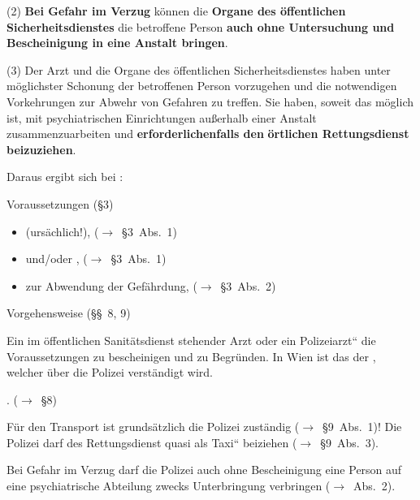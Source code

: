 {\mdseries
(2) \textbf{Bei Gefahr im Verzug} können die \textbf{Organe des
öffentlichen Sicherheitsdienstes} die betroffene Person \textbf{auch
ohne Untersuchung und Bescheinigung in eine Anstalt bringen}.}

{\mdseries
(3) Der Arzt und die Organe des öffentlichen Sicherheitsdienstes haben
unter möglichster Schonung der betroffenen Person vorzugehen und die
notwendigen Vorkehrungen zur Abwehr von Gefahren zu treffen. Sie haben,
soweit das möglich ist, mit psychiatrischen Einrichtungen
au{\ss}erhalb einer Anstalt zusammenzuarbeiten und
\textbf{erforderlichenfalls den }\textbf{örtlichen Rettungsdienst
beizuziehen}.}

{\mdseries
Daraus ergibt sich bei
:}

{\color{black}
Voraussetzungen ({\S}3)}

\begin{itemize}
\item {}
(ursächlich!), (${\rightarrow}$~{\S}3~Abs.~1)

\item {}  und/oder
,
(${\rightarrow}$~{\S}3~Abs.~1)

\item {} zur Abwendung der Gefährdung,
(${\rightarrow}$~{\S}3~Abs.~2)

\end{itemize}
{\color{black}
Vorgehensweise ({\S}{\S}~8, 9)}

Ein {\quotedblbase}im öffentlichen Sanitätsdienst stehender Arzt
oder ein Polizeiarzt{\textquotedblleft} die Voraussetzungen zu
bescheinigen und zu Begr\"unden. In Wien ist das der
{\quotedblbase},
welcher \"uber die Polizei verständigt wird. 

.
(${\rightarrow}$~{\S}8)

F\"ur den Transport ist grundsätzlich die Polizei zuständig
(${\rightarrow}$~{\S}9~Abs.~1)! Die Polizei darf des Rettungsdienst
quasi als {\quotedblbase}Taxi{\textquotedblleft} beiziehen
(${\rightarrow}$~{\S}9~Abs.~3). 

Bei Gefahr im Verzug darf die Polizei auch ohne Bescheinigung eine
Person auf eine psychiatrische Abteilung zwecks Unterbringung
verbringen (${\rightarrow}$~Abs.~2). 

